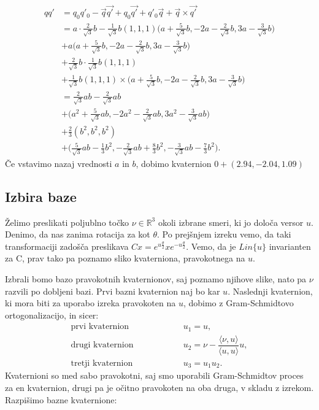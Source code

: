 \documentclass[a4paper,12pt]{article}
\def\R{\mathbb{R}} %
\newcommand{\dotpr}[2]{\langle #1, #2 \rangle}
\begin{document}
\begin{align*}
   qq' &= q_{0}q'_{0} - \vec{q}\vec{q'} + q_{0}\vec{q'} + q'_{0}\vec{q} + \vec{q} \times \vec{q'}\\
       &= a \cdot \frac{2}{\sqrt{3}}b - \frac{1}{\sqrt{3}}b(1,1,1)\bigl( a + \frac{5}{\sqrt{3}}b, -2 a - \frac{2}{\sqrt{3}}b, 3a - \frac{3}{\sqrt{3}}b \bigr)\\
       &+ a \bigl( a + \frac{5}{\sqrt{3}}b, -2 a - \frac{2}{\sqrt{3}}b, 3a - \frac{3}{\sqrt{3}}b \bigr)\\
       &+ \frac{2}{\sqrt{3}}b \cdot \frac{1}{\sqrt{3}}b(1,1,1)\\
       &+ \frac{1}{\sqrt{3}}b(1,1,1) \times \bigl( a + \frac{5}{\sqrt{3}}b, -2 a - \frac{2}{\sqrt{3}}b, 3a - \frac{3}{\sqrt{3}}b \bigr)\\
       &= \frac{2}{\sqrt{3}}ab - \frac{2}{\sqrt{3}}ab\\
       &+ \bigl(a^2 + \frac{5}{\sqrt{3}}ab, -2a^2 - \frac{2}{\sqrt{3}}ab, 3a^2 - \frac{3}{\sqrt{3}}ab \bigr)\\
       &+ \frac{2}{3}(b^2, b^2, b^2)\\
       &+ \bigl( \frac{5}{\sqrt{3}}ab - \frac{1}{3}b^2, -\frac{2}{\sqrt{3}}ab + \frac{8}{3}b^2, -\frac{3}{\sqrt{3}}ab -\frac{7}{3}b^2\bigr).
\end{align*}
Če vstavimo nazaj vrednosti $a$ in $b$, dobimo kvaternion $0 + (2.94, -2.04, 1.09)$


\subsection{Izbira baze}

Želimo preslikati poljublno točko $\nu \in \R^3$ okoli izbrane smeri, ki jo določa versor $u$. Denimo, da nas zanima rotacija za kot $\theta$.
Po prejšnjem izreku vemo, da taki transformaciji zadošča preslikava $Cx = e^{u\frac{\theta}{2}}xe^{-u\frac{\theta}{2}}$. Vemo, da je $Lin\{u\}$ invarianten za C, prav tako pa poznamo sliko kvaterniona,
pravokotnega na $u$.

Izbrali bomo bazo pravokotnih kvaternionov, saj poznamo njihove slike, nato pa $\nu$ razvili po dobljeni bazi. Prvi bazni kvaternion naj bo kar $u$. Naslednji kvaternion, ki mora biti za uporabo izreka pravokoten na $u$, dobimo z Gram-Schmidtovo ortogonalizacijo, in sicer:
\begin{align*}
   \text{prvi kvaternion} &\hspace{5em}  u_{1} = u,\\
   \text{drugi kvaternion} &\hspace{5em}   u_{2} = \nu - \dfrac{\dotpr{\nu}{u}}{\dotpr{u}{u}} u,\\
   \text{tretji kvaternion} &\hspace{5em} u_{3} = u_{1} u_{2}.
\end{align*}
Kvaternioni so med sabo pravokotni, saj smo uporabili Gram-Schmidtov proces za en kvaternion, drugi pa je očitno pravokoten na oba druga, v skladu z izrekom. Razpišimo bazne kvaternione:
\end{document}
